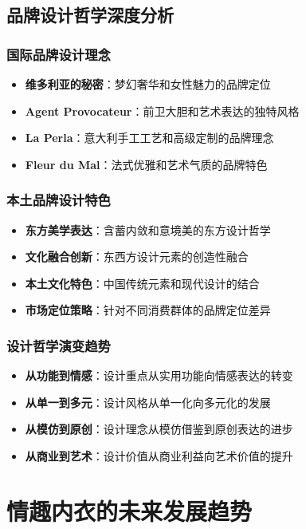 \documentclass[12pt,UTF8]{ctexbook}
\begin{document}
\subsection{品牌设计哲学深度分析}
\subsubsection{国际品牌设计理念}
\begin{itemize}[leftmargin=2cm]
	\item \textbf{维多利亚的秘密}：梦幻奢华和女性魅力的品牌定位
	\item \textbf{Agent Provocateur}：前卫大胆和艺术表达的独特风格
	\item \textbf{La Perla}：意大利手工工艺和高级定制的品牌理念
	\item \textbf{Fleur du Mal}：法式优雅和艺术气质的品牌特色
\end{itemize}

\subsubsection{本土品牌设计特色}
\begin{itemize}[leftmargin=2cm]
	\item \textbf{东方美学表达}：含蓄内敛和意境美的东方设计哲学
	\item \textbf{文化融合创新}：东西方设计元素的创造性融合
	\item \textbf{本土文化特色}：中国传统元素和现代设计的结合
	\item \textbf{市场定位策略}：针对不同消费群体的品牌定位差异
\end{itemize}

\subsubsection{设计哲学演变趋势}
\begin{itemize}[leftmargin=2cm]
	\item \textbf{从功能到情感}：设计重点从实用功能向情感表达的转变
	\item \textbf{从单一到多元}：设计风格从单一化向多元化的发展
	\item \textbf{从模仿到原创}：设计理念从模仿借鉴到原创表达的进步
	\item \textbf{从商业到艺术}：设计价值从商业利益向艺术价值的提升
\end{itemize}

\section{情趣内衣的未来发展趋势}
\end{document}

